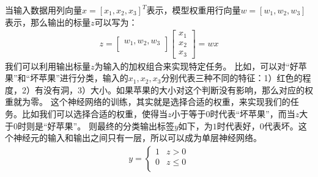 \documentclass[letterpaper,10pt,english]{sphinxmanual}
\begin{document}
\sphinxAtStartPar
当输入数据用列向量\({x}=[x_1,x_2,x_3]^T\)表示，模型权重用行向量\({w}=[w_1,w_2,w_3]\)表示，那么输出的标量\(z\)可以写为：
\begin{equation}\label{equation:appendix_machine_learning_introduction/neural_network:appendix_machine_learning_introduction/neural_network:0}
\begin{split}z =
\begin{bmatrix}
w_1,w_2,w_3\\
\end{bmatrix}
\begin{bmatrix}
x_1\\
x_2\\
x_3
\end{bmatrix}
={w}{x}\end{split}
\end{equation}
\sphinxAtStartPar
我们可以利用输出标量\(z\)为输入的加权组合来实现特定任务。
比如，可以对“好苹果”和“坏苹果”进行分类，输入的\(x_1,x_2,x_3\)分别代表三种不同的特征：1）红色的程度，2）有没有洞，3）大小。如果苹果的大小对这个判断没有影响，那么对应的权重就为零。
这个神经网络的训练，其实就是选择合适的权重，来实现我们的任务。比如我们可以选择合适的权重，使得当\(z\)小于等于\(0\)时代表“坏苹果”，而当\(z\)大于\(0\)时则是“好苹果”。
则最终的分类输出标签\(y\)如下，为\(1\)时代表好，\(0\)代表坏。这个神经元的输入和输出之间只有一层，所以可以成为单层神经网络。
\begin{equation}\label{equation:appendix_machine_learning_introduction/neural_network:appendix_machine_learning_introduction/neural_network:1}
\begin{split}y =
\begin{cases}
1 &  z>0 \\
0 & z \leq 0 \\
\end{cases}\end{split}
\end{equation}
\end{document}
